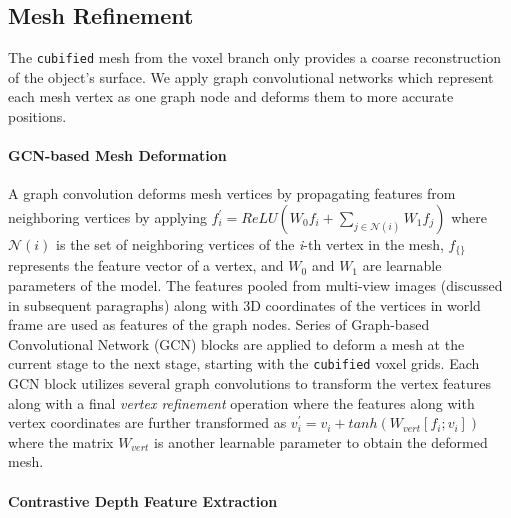 
\subsection{Mesh Refinement}
\label{subsec:mesh_refinement}
The \texttt{cubified} mesh from the voxel branch only provides a coarse reconstruction of the object's surface. We apply graph convolutional networks which represent each mesh vertex as one graph node and deforms them to more accurate positions.

\paragraph{GCN-based Mesh Deformation}

A graph convolution deforms mesh vertices by propagating features from neighboring vertices by applying
$f_{i}^{'} = ReLU(W_0f_i + \sum_{j \in \mathcal{N}(i)} W_1 f_j)$ where $\mathcal{N}(i)$ is the set of neighboring vertices of the \emph{i}-th vertex in the mesh, $f_{\{\}}$ represents the feature vector of a vertex, and $W_0$ and $W_1$ are learnable parameters of the model.
The features pooled from multi-view images (discussed in subsequent paragraphs) along with 3D coordinates of the vertices in world frame are used as features of the graph nodes.
Series of Graph-based Convolutional Network (GCN) blocks are applied to deform a mesh at the current stage to the next stage, starting with the \texttt{cubified} voxel grids.
Each GCN block utilizes several graph convolutions to transform the vertex features along with a final \emph{vertex refinement} operation where the features along with vertex coordinates are further transformed as $v_i^{'} = v_i + tanh(W_{vert}[f_i;v_i])$ where the matrix $W_{vert}$ is another learnable parameter to obtain the deformed mesh.

\label{subsec:contrastive_depth_feature_extraction}
\paragraph{Contrastive Depth Feature Extraction}


